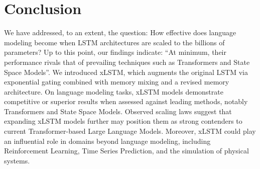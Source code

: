 \section{Conclusion}
We have addressed, to an extent, the question: How effective does language modeling become when LSTM architectures are scaled to the billions of parameters? Up to this point, our findings indicate: ``At minimum, their performance rivals that of prevailing techniques such as Transformers and State Space Models''. We introduced xLSTM, which augments the original LSTM via exponential gating combined with memory mixing and a revised memory architecture. On language modeling tasks, xLSTM models demonstrate competitive or superior results when assessed against leading methods, notably Transformers and State Space Models. Observed scaling laws suggest that expanding xLSTM models further may position them as strong contenders to current Transformer-based Large Language Models. Moreover, xLSTM could play an influential role in domains beyond language modeling, including Reinforcement Learning, Time Series Prediction, and the simulation of physical systems.


